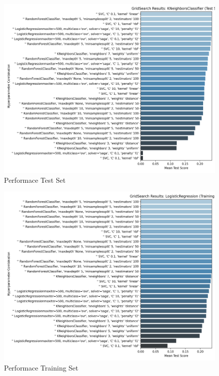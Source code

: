 \documentclass{article}
\begin{document}
\begin{figure}[H] %
    \centering
    \includegraphics[width=.7
    \linewidth]{TestSet.png}
    \caption{Performace Test Set}
    \label{fig:disease_distribution}
    \vspace{-1em} %
\end{figure}

\begin{figure}[H] %
    \centering
    \includegraphics[width=.7
    \linewidth]{TrainingSet.png}
    \caption{Performace Training Set}
    \label{fig:disease_distribution}
    \vspace{-1em} %
\end{figure}


\label{sec:appendix}


\end{document}
